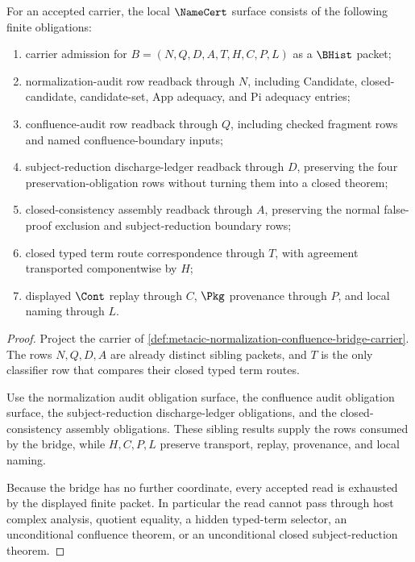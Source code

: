 \begin{theorem}
\label{thm:metacic-normalization-confluence-bridge-namecert-obligations}
For an accepted \MetacicNormalizationConfluenceBridgeUp{} carrier, the local $\NameCert$ surface consists of the following finite obligations:
\begin{enumerate}
\item carrier admission for $B=(N,Q,D,A,T,H,C,P,L)$ as a $\BHist$ packet;
\item normalization-audit row readback through $N$, including Candidate, closed-candidate, candidate-set, App adequacy, and Pi adequacy entries;
\item confluence-audit row readback through $Q$, including checked fragment rows and named confluence-boundary inputs;
\item subject-reduction discharge-ledger readback through $D$, preserving the four preservation-obligation rows without turning them into a closed theorem;
\item closed-consistency assembly readback through $A$, preserving the normal false-proof exclusion and subject-reduction boundary rows;
\item closed typed term route correspondence through $T$, with agreement transported componentwise by $H$;
\item displayed $\Cont$ replay through $C$, $\Pkg$ provenance through $P$, and local naming through $L$.
\end{enumerate}
\end{theorem}
\begin{proof}
Project the carrier of \autoref{def:metacic-normalization-confluence-bridge-carrier}. The rows $N,Q,D,A$ are already distinct sibling packets, and $T$ is the only classifier row that compares their closed typed term routes.

Use the normalization audit obligation surface, the confluence audit obligation surface, the subject-reduction discharge-ledger obligations, and the closed-consistency assembly obligations. These sibling results supply the rows consumed by the bridge, while $H,C,P,L$ preserve transport, replay, provenance, and local naming.

Because the bridge has no further coordinate, every accepted read is exhausted by the displayed finite packet. In particular the read cannot pass through host complex analysis, quotient equality, a hidden typed-term selector, an unconditional confluence theorem, or an unconditional closed subject-reduction theorem.
\end{proof}

